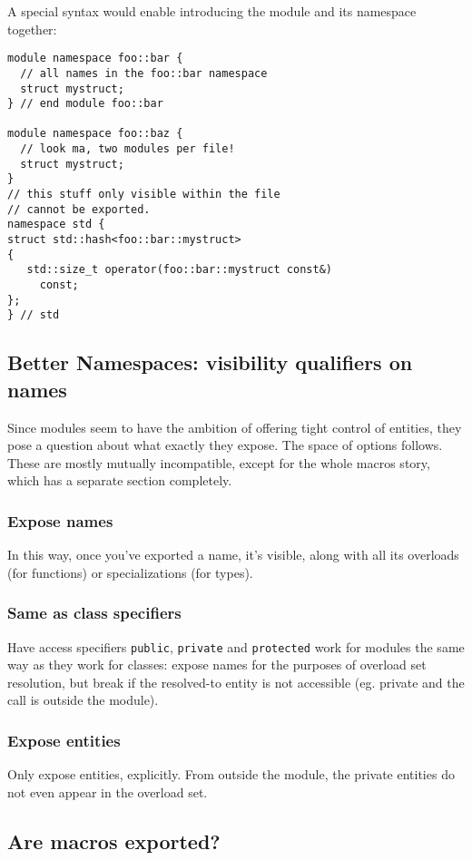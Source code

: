 \documentclass[reqno]{article}
\begin{document}
\begin{multicols}{2}
A special syntax would enable introducing the module and its namespace together:

\begin{verbatim}
module namespace foo::bar {
  // all names in the foo::bar namespace
  struct mystruct;
} // end module foo::bar

module namespace foo::baz {
  // look ma, two modules per file!
  struct mystruct;
}
// this stuff only visible within the file
// cannot be exported.
namespace std {
struct std::hash<foo::bar::mystruct>
{
   std::size_t operator(foo::bar::mystruct const&)
     const;
};
} // std
\end{verbatim}


\subsection{Better Namespaces: visibility qualifiers on names}

Since modules seem to have the ambition of offering tight control of entities,
they pose a question about what exactly they expose. The space of options
follows. These are mostly mutually incompatible, except for the whole macros
story, which has a separate section completely.

\subsubsection{Expose names}
In this way, once you've exported a name, it's visible, along with all its
overloads (for functions) or specializations (for types).

\subsubsection{Same as class specifiers}
Have access specifiers \texttt{public}, \texttt{private} and \texttt{protected}
work for modules the same way as they work for classes: expose names for the
purposes of overload set resolution, but break if the resolved-to entity is
not accessible (eg. private and the call is outside the module).

\subsubsection{Expose entities}
Only expose entities, explicitly. From outside the module, the private entities
do not even appear in the overload set.


\subsection{Are macros exported?}


\end{multicols}
\end{document}

